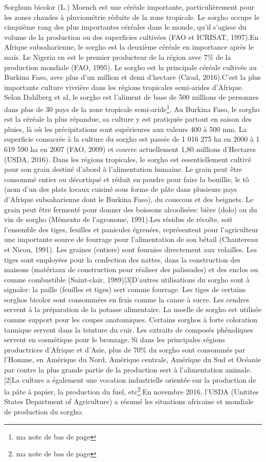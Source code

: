 \documentclass[a4paper,11pt]{article}
\begin{document}
Sorghum bicolor (L.) Moench est une céréale importante,
particulièrement pour les zones chaudes à pluviométrie réduite de la
zone tropicale. Le sorgho occupe le cinquième rang des plus
importantes céréales dans le monde, qu’il s’agisse du volume de la
production ou des superficies cultivées (FAO et ICRISAT, 1997).En
Afrique subsaharienne, le sorgho est la deuxième céréale en importance
après le maïs. Le Nigeria en est le premier producteur de la région
avec 7\% de la production mondiale (FAO, 1995). Le sorgho est la
principale céréale cultivée au Burkina Faso, avec plus d’un million et
demi d’hectare (Cirad, 2016).C’est la plus importante culture vivrière
dans les régions tropicales semi-arides d’Afrique. Selon Dahlberg et
al, le sorgho est l’aliment de base de 500 millions de personnes dans
plus de 30 pays de la zone tropicale semi-aride\footnote{ma note de
bas de page}. Au Burkina Faso, le sorgho est la céréale la plus
répandue, sa culture y est pratiquée partout en saison des pluies, là
où les précipitations sont supérieures aux valeurs 400 à 500 mm. La superficie
consacrée à la culture du sorgho est passée de 1 016 275 ha en 2000 à
1 619 590 ha en 2007 (FAO, 2009) et couvre actuellement 1,80 millions
d’Hectares (USDA, 2016). Dans les régions tropicales, le sorgho est
essentiellement cultivé pour son grain destiné d’abord à
l’alimentation humaine. Le grain peut être consommé entier ou
décortiqué et réduit en poudre pour faire la bouillie, le tô (nom d’un
des plats locaux cuisiné sous forme de pâte dans plusieurs pays
d’Afrique subsaharienne dont le Burkina Faso), du couscous et des
beignets. Le grain peut être fermenté pour donner des boissons
alcoolisées: bière (dolo) ou du vin de sorgho (Mémento de l’agronome,
1991).Les résidus de récolte, soit l’ensemble des tiges, feuilles et
panicules égrenées, représentent pour l’agriculteur une importante
source de fourrage pour l’alimentation de son bétail (Chantereau et
Nicou, 1991). Les graines (entiers) sont fournies directement aux
volailles. Les tiges sont employées pour la confection des nattes,
dans la construction des maisons (matériaux de construction pour
réaliser des palissades) et des enclos ou comme combustible
(Saint-clair, 1989)[3]D’autres utilisations du sorgho sont à
signaler: la paille (feuilles et tiges) sert comme fourrage. Les
tiges de certains sorghos bicolor sont consommées en frais comme la
canne à sucre. Les cendres servent à la préparation de la potasse
alimentaire. La moelle de sorgho est utilisée comme support pour les
coupes anatomiques. Certains sorghos à forte coloration tannique
servent dans la teinture du cuir. Les extraits de composés phénoliques
servent en cosmétique pour le bronzage. Si dans les principales
régions productrices d’Afrique et d’Asie, plus de 70\% du sorgho sont
consommés par l’Homme, en Amérique du Nord, Amérique centrale,
Amérique du Sud et Océanie par contre la plus grande partie de la
production sert à l’alimentation animale.[2]La culture a également une
vocation industrielle orientée sur la production de la pâte à papier,
la production du fuel, etc\footnote{ma note de bas de page}.En
novembre 2016, l’USDA (Unitites States Department of Agriculture) a
résumé les situations africaine et mondiale de production du sorgho:
\end{document}
